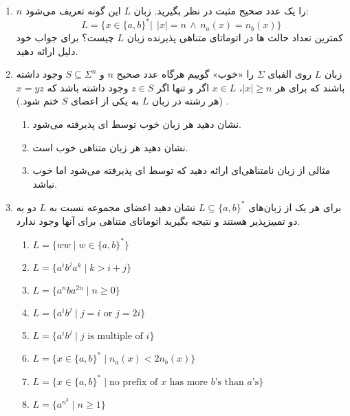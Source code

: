 \documentclass{article}
\newcommand*\circled[1]{
	\tikz[baseline=(char.base)]{
		\node[shape=circle,draw,inner sep=-1pt,color=red] (char) {\textcolor{black}{#1}\strut}
	}\kern-3pt
}
\let\oldlabelenumi=\labelenumi
\newcommand{\StartCircledEnumi}{\renewcommand{\labelenumi}{\circled{\oldlabelenumi}}}
\newcommand{\EndCircledEnumi}{\renewcommand{\labelenumi}{\oldlabelenumi}}
\newcommand{\CircledEnumi}{\StartCircledEnumi\item\EndCircledEnumi}
\begin{document}
\begin{enumerate}
		
		\item 
		$n$
		را یک عدد صحیح مثبت در نظر بگیرید. زبان $L$ این گونه تعریف می‌شود:
		$$ L =\{ x \in \{ a,b \}^* | \;\, |x| = n \, \land \, n_a(x) = n_b(x)\}  $$
		کمترین تعداد حالت ها  در اتوماتای متناهی پذیرنده زبان $L$ چیست؟
		برای جواب خود دلیل ارائه دهید.
		
	\item
	زبان $L$ روی الفبای $\Sigma$ را «خوب» گوییم هرگاه عدد صحیح $n$ و $S \subseteq \Sigma^n$ وجود داشته باشند که برای هر $|x| \geq n$،
	$x \in L$
	اگر و تنها اگر $z \in S$ وجود داشته باشد که $x = yz$. (هر رشته در زبان $L$ به یکی از اعضای $S$ ختم شود.)

		\begin{enumerate}
		
		\item 
		نشان دهید هر زبان خوب توسط ای پذیرفته می‌شود.
		\item 
		نشان دهید هر زبان متناهی خوب است.
		\item 
		مثالی از زبان نامتناهی‌ای ارائه دهید که توسط ای پذیرفته می‌شود اما خوب نباشد.
		\end{enumerate}	
		
	
	\CircledEnumi
	برای هر یک از زبان‌های
	$L \subseteq \{a, b\}^*$
	نشان دهید اعضای مجموعه 
	نسبت به $L$ دو به دو تمییزپذیر
	هستند و نتیجه بگیرید اتوماتای متناهی 
	برای آنها وجود ندارد.
	\begin{latin}
		\begin{enumerate}
			\item $L = \{ww \; | \;  w \in \{a,b\}^*\}$
			\item $L = \{a^ib^ja^k \; | \; k >  i + j \}$
			\item $L = \{a^nba^{2n} \; | \; n \geq 0\}$
			
			\item $L = \{a^ib^j \; | \; \text{$j = i$ or $j = 2i$}\}$
			\item $L = \{a^ib^j \; | \; \text{$j$ is multiple of $i$}\}$
			\item $L = \{x \in \{a,b\}^* \; | \; n_a(x) < 2n_b(x) \}$
			\item $L = \{x \in \{a,b\}^* \; | \; \text{no prefix of $x$ has more $b$'s than $a$'s} \}$
			\item $L = \{a^{n^3} \; | \;  n \geq 1\}$
			
		\end{enumerate}
	\end{latin}
\end{enumerate}
\end{document}
